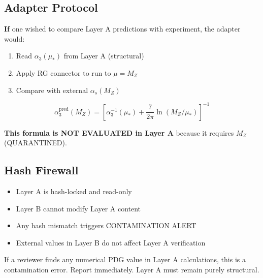 \documentclass[11pt,a4paper]{article}
\theoremstyle{definition}
\begin{document}
\subsection{Adapter Protocol}
\label{subsec:adapter-protocol}

\textbf{If} one wished to compare Layer A predictions with experiment, the
adapter would:

\begin{enumerate}
  \item Read $\alpha_3(\mu_*)$ from Layer A (structural)
  \item Apply RG connector to run to $\mu = M_Z$
  \item Compare with external $\alpha_s(M_Z)$
\end{enumerate}

\begin{equation}
  \label{eq:adapter-formula}
  \alpha_3^{\text{pred}}(M_Z) = \left[ \alpha_3^{-1}(\mu_*) + \frac{7}{2\pi}\ln(M_Z/\mu_*) \right]^{-1}
\end{equation}

\textbf{This formula is NOT EVALUATED in Layer A} because it requires $M_Z$ (QUARANTINED).

\subsection{Hash Firewall}
\label{subsec:hash-firewall}

\begin{hashbox}
\begin{itemize}
  \item Layer A is hash-locked and read-only
  \item Layer B cannot modify Layer A content
  \item Any hash mismatch triggers CONTAMINATION ALERT
  \item External values in Layer B do not affect Layer A verification
\end{itemize}
\end{hashbox}

\begin{trapbox}
If a reviewer finds any numerical PDG value in Layer A calculations,
this is a contamination error. Report immediately.
Layer A must remain purely structural.
\end{trapbox}

\newpage

\end{document}
